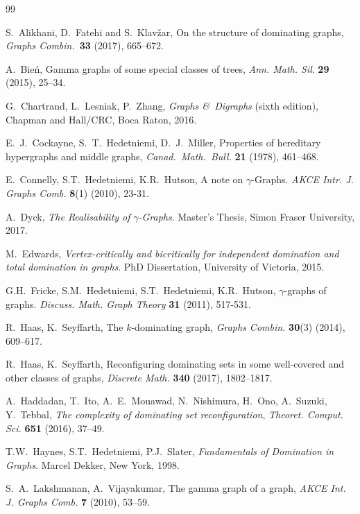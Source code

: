 \documentclass[12pt]{article}%
\begin{document}
\begin{thebibliography}{99}                                                                                               %


S.~Alikhani, D.~Fatehi and S.~Klav\v{z}ar, On the structure
of dominating graphs, \emph{Graphs Combin.}\ \textbf{33} (2017), 665--672.

A.~Bie\'{n}, Gamma graphs of some special classes of trees,
\emph{Ann. Math. Sil}. \textbf{29} (2015), 25--34.

G.~Chartrand, L.~Lesniak, P.~Zhang, \emph{Graphs \&\ Digraphs
}(sixth edition), Chapman and Hall/CRC, Boca Raton, 2016.

E.~J.~Cockayne, S.~T.~Hedetniemi, D.~J.~Miller, Properties of
hereditary hypergraphs and middle graphs, \emph{Canad.~Math.~Bull.}
\textbf{21} (1978), 461--468.

E.~Connelly, S.T.~Hedetniemi, K.R.~Hutson, A note on $\gamma
$-Graphs. \emph{AKCE Intr. J. Graphs Comb.} \textbf{8}(1) (2010), 23-31.

A.~Dyck, \emph{The Realisability of }$\gamma$\emph{-Graphs}.
Master's Thesis, Simon Fraser University, 2017.

M.~Edwards, \emph{Vertex-critically and bicritically for
independent domination and total domination in graphs}. PhD Dissertation,
University of Victoria, 2015.

G.H.~Fricke, S.M.~Hedetniemi, S.T.~Hedetniemi, K.R.~Hutson,
$\gamma$-graphs of graphs. \emph{Discuss. Math. Graph Theory} \textbf{31}
(2011), 517-531.

R.~Haas, K.~Seyffarth, The $k$-dominating graph, \emph{Graphs
Combin.} \textbf{30}(3) (2014), 609--617.

R.~Haas, K.~Seyffarth, Reconfiguring dominating sets in some
well-covered and other classes of graphs, \emph{Discrete Math.} \textbf{340
}(2017), 1802--1817.

A.~Haddadan, T.~Ito, A.~E.~Mouawad, N.~Nishimura,
H.~Ono, A.~Suzuki, Y.~Tebbal, \emph{The complexity of dominating set
reconfiguration}, \emph{Theoret. Comput. Sci.} \textbf{651} (2016), 37--49.

T.W.~Haynes, S.T.~Hedetniemi, P.J.~Slater, \emph{Fundamentals of
Domination in Graphs}. Marcel Dekker, New York, 1998.

S.~A.~Lakshmanan, A.~Vijayakumar, The gamma graph of a graph,
\emph{AKCE Int. J. Graphs Comb.} \textbf{7} (2010), 53--59.


\end{thebibliography}
\end{document}
